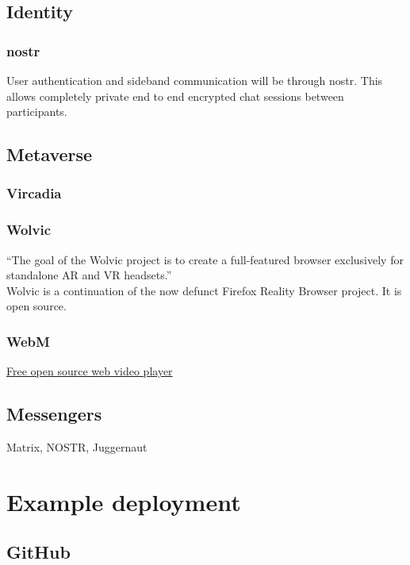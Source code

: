 



\lipsum[50]
\section{Identity}
\subsection{nostr}
User authentication and sideband communication will be through nostr. This allows completely private end to end encrypted chat sessions between participants.
\section{Metaverse}
\lipsum[50]
\subsection{Vircadia}
\lipsum[50]
\subsection{Wolvic}
``The goal of the Wolvic project is to create a full-featured browser exclusively for standalone AR and VR headsets.''\\
Wolvic is a continuation of the now defunct Firefox Reality Browser project. It is open source.
\subsection{WebM}
\href{https://www.webmproject.org/about/}{Free open source web video player}	
\lipsum[50]
\section{Messengers}
Matrix, NOSTR, Juggernaut
\chapter{Example deployment }
\lipsum[50]
\section{GitHub }
\lipsum[50]